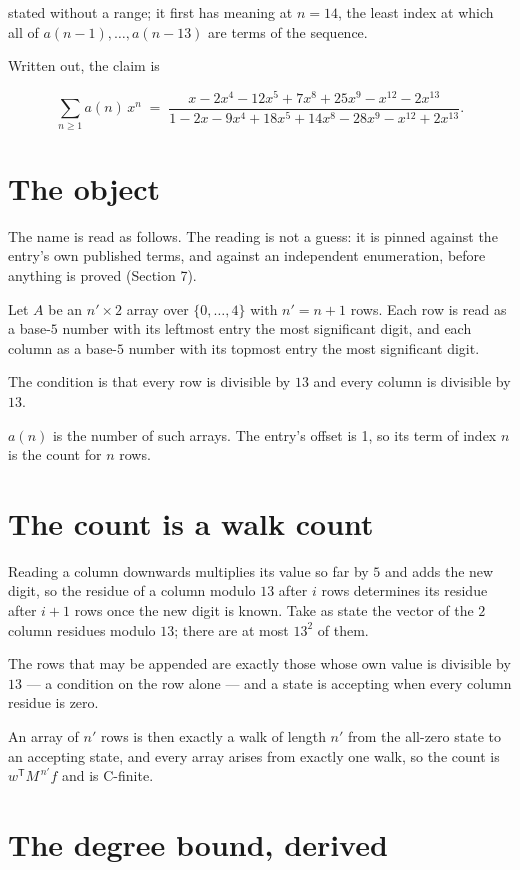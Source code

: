 \documentclass[11pt]{article}
\theoremstyle{definition}
\begin{document}
stated without a range; it first has meaning at $n = 14$, the least index at which all of $a(n-1),\dots,a(n-13)$ are terms of the sequence.

Written out, the claim is

\[\sum_{n \ge 1} a(n)\,x^n \;=\; \frac{x - 2x^{4} - 12x^{5} + 7x^{8} + 25x^{9} - x^{12} - 2x^{13}}{1 - 2x - 9x^{4} + 18x^{5} + 14x^{8} - 28x^{9} - x^{12} + 2x^{13}}.\]

\section{The object}

The name is read as follows. The reading is not a guess: it is pinned against the entry's own published terms, and against an independent enumeration, before anything is proved (Section 7).

Let $A$ be an $n' \times 2$ array over $\{0,\dots,4\}$ with $n' = n + 1$ rows. Each row is read as a base-$5$ number with its leftmost entry the most significant digit, and each column as a base-$5$ number with its topmost entry the most significant digit.

The condition is that every row is divisible by $13$ and every column is divisible by $13$.

$a(n)$ is the number of such arrays. The entry's offset is 1, so its term of index $n$ is the count for $n$ rows.

\section{The count is a walk count}

Reading a column downwards multiplies its value so far by $5$ and adds the new digit, so the residue of a column modulo $13$ after $i$ rows determines its residue after $i+1$ rows once the new digit is known. Take as state the vector of the $2$ column residues modulo $13$; there are at most $13^{2}$ of them.

The rows that may be appended are exactly those whose own value is divisible by $13$ --- a condition on the row alone --- and a state is accepting when every column residue is zero.

An array of $n'$ rows is then exactly a walk of length $n'$ from the all-zero state to an accepting state, and every array arises from exactly one walk, so the count is $w^{\mathsf T}M^{\,n'}f$ and is C-finite.

\section{The degree bound, derived}
\end{document}
